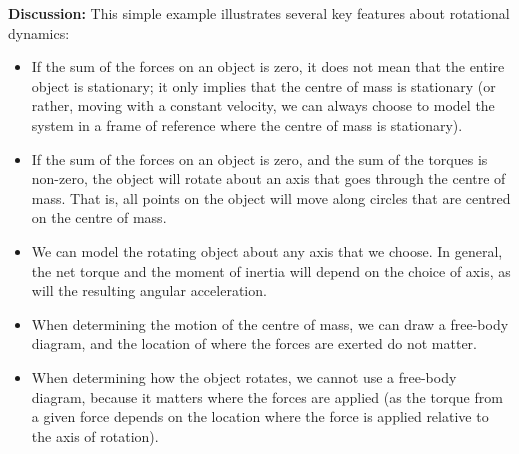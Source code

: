 \begin{example}
\textbf{Discussion: }This simple example illustrates several key features about rotational dynamics:
\begin{itemize}
\item If the sum of the forces on an object is zero, it does not mean that the entire object is stationary; it only implies that the centre of mass is stationary (or rather, moving with a constant velocity, we can always choose to model the system in a frame of reference where the centre of mass is stationary).
\item If the sum of the forces on an object is zero, and the sum of the torques is non-zero, the object will rotate about an axis that goes through the centre of mass. That is, all points on the object will move along circles that are centred on the centre of mass. 
\item We can model the rotating object about any axis that we choose. In general, the net torque and the moment of inertia will depend on the choice of axis, as will the resulting angular acceleration. 
\item When determining the motion of the centre of mass, we can draw a free-body diagram, and the location of where the forces are exerted do not matter.
\item When determining how the object rotates, we cannot use a free-body diagram, because it matters where the forces are applied (as the torque from a given force depends on the location where the force is applied relative to the axis of rotation).
\end{itemize}
\end{example}

